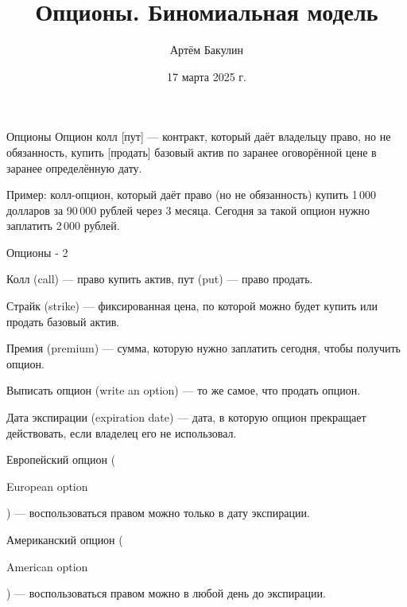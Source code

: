\documentclass{beamer}
\title{Опционы. Биномиальная модель}
\author{Артём Бакулин}
\date{17 марта 2025 г.}
\newcommand{\en}[1]{\begin{otherlanguage}{english}#1\end{otherlanguage}}
\newcommand{\usdrubstrike}{90}
\begin{document}
\begin{frame}
\titlepage
\end{frame}



\begin{frame}{Опционы}
\justifying
\alert{Опцион колл [пут]} --- контракт, который даёт владельцу право, но не обязанность, купить [продать] базовый актив по заранее оговорённой цене в заранее определённую дату. 

\justify
Пример: колл-опцион, который даёт право (но не обязанность) купить 1\,000 долларов за \usdrubstrike\,000 рублей через 3 месяца. Сегодня за такой опцион нужно заплатить 2\,000 рублей.
\end{frame}



\begin{frame}{Опционы - 2}

\justify
 \alert{Колл} (call) --- право купить актив, \alert{пут} (put) --- право продать.

\justify
\alert{Страйк} (strike) --- фиксированная цена, по которой можно будет купить или продать базовый актив.

\justify
\alert{Премия} (premium) --- сумма, которую нужно заплатить сегодня, чтобы получить опцион.

\justify
\alert{Выписать} опцион (write an option) --- то же самое, что продать опцион.

\justify
\alert{Дата экспирации} (expiration date) --- дата, в которую опцион прекращает действовать, если владелец его не использовал.

\justify
\alert{Европейский} опцион (\en{European option}) --- воспользоваться правом можно только в дату экспирации.

\justify
\alert{Американский} опцион (\en{American option}) --- воспользоваться правом можно в любой день до экспирации.
\end{frame}



\newcommand{\circlewithtext}[3]{
    \node[circle, fill, inner sep = 1.5pt] at (#1, #2) {};
    \node[anchor = north] at (#1, #2) {#3};
}
\end{document}
